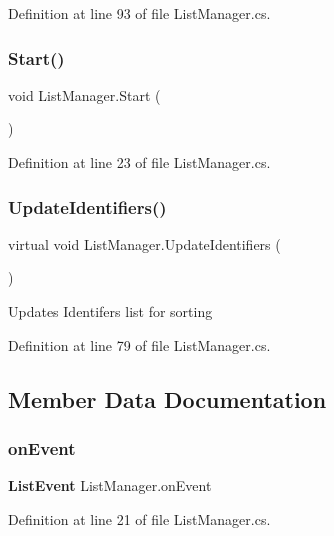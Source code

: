 Definition at line 93 of file List\+Manager.\+cs.

\mbox{\label{class_list_manager_a5522129cad973d59d80b57ba2091bfd0}} 
\subsubsection{Start()}
{\footnotesize\ttfamily void List\+Manager.\+Start (\begin{DoxyParamCaption}{ }\end{DoxyParamCaption})}



Definition at line 23 of file List\+Manager.\+cs.

\mbox{\label{class_list_manager_a1d5fe8fbf5c0860888cb6395f632b3db}} 
\subsubsection{Update\+Identifiers()}
{\footnotesize\ttfamily virtual void List\+Manager.\+Update\+Identifiers (\begin{DoxyParamCaption}{ }\end{DoxyParamCaption})\hspace{0.3cm}{\ttfamily [virtual]}}



Updates Identifers list for sorting 



Definition at line 79 of file List\+Manager.\+cs.



\subsection{Member Data Documentation}
\mbox{\label{class_list_manager_aa83a7863d792c9e75fe7866e4ee5f00e}} 
\subsubsection{on\+Event}
{\footnotesize\ttfamily \textbf{ List\+Event} List\+Manager.\+on\+Event}



Definition at line 21 of file List\+Manager.\+cs.



